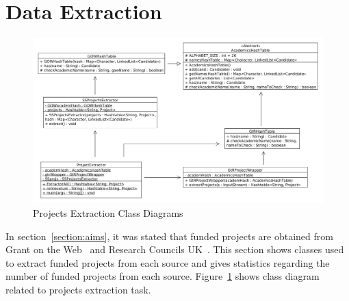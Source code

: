 \section{Data Extraction}
\begin{figure}
\centering
\includegraphics[scale=0.35]{./figures/projectsExtraction.png}
\caption{Projects Extraction Class Diagrams} \label{fig:projectsExtraction} 
\end{figure}
In section~\ref{section:aims}, it was stated that funded projects are obtained from Grant on the Web~\cite{gow} and Research Councils UK~\cite{gtr}.
This section shows classes used to extract funded projects from each source and gives statistics regarding the number of funded projects from each source.
Figure~\ref{fig:projectsExtraction} shows class diagram related to projects extraction task.

